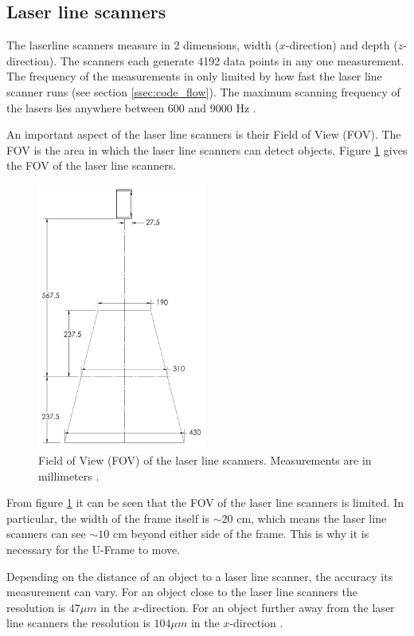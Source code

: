 \subsection{Laser line scanners} \label{ssec:laser_line_scanners}
The laserline scanners measure in 2 dimensions, width ($x$-direction) and depth ($z$-direction). The scanners each generate 4192 data points in any one measurement. The frequency of the measurements in only limited by how fast the laser line scanner runs (see section \ref{ssec:code_flow}). The maximum scanning frequency of the lasers lies anywhere between 600 and 9000 Hz \cite{gocator2650datasheet}.

An important aspect of the laser line scanners is their Field of View (FOV).
The FOV is the area in which the laser line scanners can detect objects. Figure \ref{fig:lls_fov} gives the FOV of the laser line scanners.
\begin{figure}[H]
    \centering
    \includegraphics[width=0.5\textwidth]{images/laser_line_scanner_fov.png}
    \caption{Field of View (FOV) of the laser line scanners. Measurements are in millimeters \cite{gocator2650FOV}.}
    \label{fig:lls_fov}
\end{figure}
From figure \ref{fig:lls_fov} it can be seen that the FOV of the laser line scanners is limited. In particular, the width of the frame itself is $\sim 20$ cm, which means the laser line scanners can see $\sim 10$ cm beyond either side of the frame. This is why it is necessary for the U-Frame to move.

Depending on the distance of an object to a laser line scanner, the accuracy its measurement can vary. For an object close to the laser line scanners the resolution is $47 \mu m$ in the $x$-direction. For an object further away from the laser line scanners the resolution is $104 \mu m$ in the $x$-direction \cite{gocator2650datasheet}.


